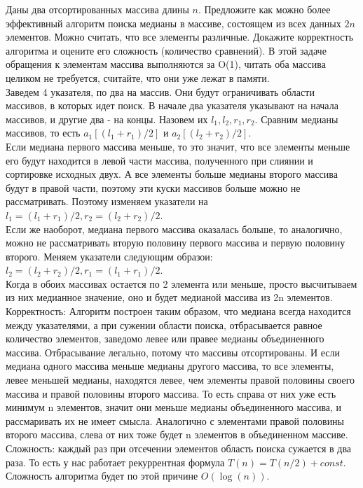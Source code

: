 \documentclass[12pt]{extreport}
\theoremstyle{definiton}
\theoremstyle{definition}
\theoremstyle{definition}
\begin{document}
	\Pr[4] Даны два отсортированных массива длины $n$. Предложите как можно более эффективный алгоритм поиска медианы в массиве, состоящем из всех данных $2n$ элементов. Можно считать, что все элементы различные. Докажите корректность алгоритма и оцените его сложность (количество сравнений). В этой задаче обращения к элементам массива выполняются за O(1), читать оба массива целиком не требуется, считайте, что они уже лежат в памяти.
	\newline
	\\ Заведем 4 указателя, по два на массив. Они будут ограничивать области массивов, в которых идет поиск. В начале два указателя указывают на начала массивов, и другие два - на концы. Назовем их $l_1,l_2,r_1,r_2$. Сравним медианы массивов, то есть $a_1[(l_1+r_1)/2]$ и $a_2[(l_2+r_2)/2]$. 
	\\Если медиана первого массива меньше, то это значит, что все элементы меньше его будут находится в левой части массива, полученного при слиянии и сортировке исходных двух. А все элементы больше медианы второго массива будут в правой части, поэтому эти куски массивов больше можно не рассматривать. Поэтому изменяем указатели на $l_1 = (l_1+r_1)/2, r_2 = (l_2+r_2)/2$.
	\\ Если же наоборот, медиана первого массива оказалась больше, то аналогично, можно не рассматривать вторую половину первого массива и первую половину второго. Меняем указатели следующим образои: $l_2 = (l_2+r_2)/2, r_1 = (l_1+r_1)/2$.
	\\ Когда в обоих массивах остается по 2 элемента или меньше, просто высчитываем из них медианное значение, оно и будет медианой массива из 2n элементов.
	\\ Корректность: Алгоритм построен таким образом, что медиана всегда находится между указателями, а при сужении области поиска, отбрасывается равное количество элементов, заведомо левее или правее медианы объединенного массива. Отбрасывание легально, потому что массивы отсортированы. И если медиана одного массива меньше медианы другого массива, то все элементы, левее меньшей медианы, находятся левее, чем элементы правой половины своего массива и правой половины второго массива. То есть справа от них уже есть минимум n элементов, значит они меньше медианы объединенного массива, и рассмаривать их не имеет смысла. Аналогично с элементами правой половины второго массива, слева от них тоже будет n элементов в объединенном массиве.
	\\ Сложность: каждый раз при отсечении элементов область поиска сужается в два раза. То есть у нас работает рекуррентная формула $T(n) = T(n/2) + const$. Сложность алгоритма будет по этой причине $O(\log(n))$.
\end{document}
